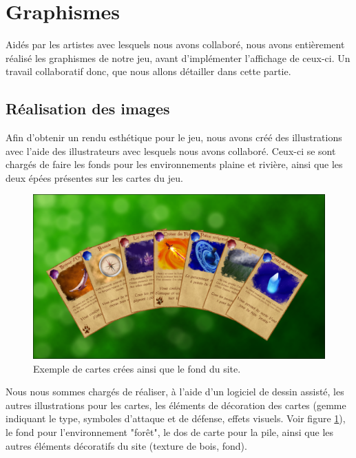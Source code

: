 \documentclass[12pt]{report}
\begin{document}
    \section{Graphismes}

	    Aidés par les artistes avec lesquels nous avons collaboré, nous avons entièrement réalisé les graphismes de notre jeu, avant d'implémenter l'affichage de ceux-ci. Un travail collaboratif donc, que nous allons détailler dans cette partie.

        \subsection{Réalisation des images}

        Afin d'obtenir un rendu esthétique pour le jeu, nous avons créé des illustrations avec l'aide des illustrateurs avec lesquels nous avons collaboré. Ceux-ci se sont chargés de faire les fonds pour les environnements plaine et rivière, ainsi que les deux épées présentes sur les cartes du jeu.

        \begin{figure}[h!]
	       	\centering
           	\includegraphics[scale=0.45]{cards.png}
           	\caption{Exemple de cartes crées ainsi que le fond du site.}
           	\label{fig:cartes}
        \end{figure}

        Nous nous sommes chargés de réaliser, à l'aide d'un logiciel de dessin assisté, les autres illustrations pour les cartes, les éléments de décoration des cartes (gemme indiquant le type, symboles d'attaque et de défense, effets visuels. Voir figure \ref{fig:cartes}), le fond pour l'environnement "forêt", le dos de carte pour la pile, ainsi que les autres éléments décoratifs du site (texture de bois, fond).
\end{document}
